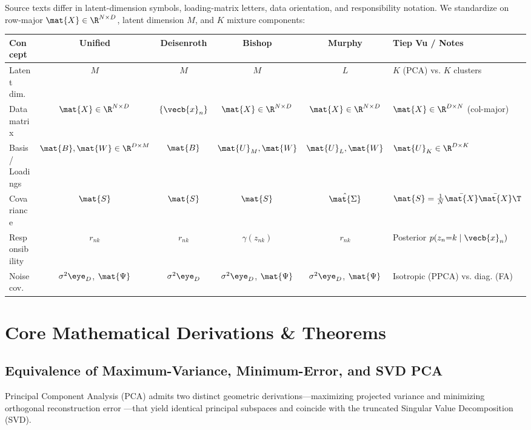 \documentclass[../../../../master.tex]{subfiles}
\begin{document}
\begin{crossbook}
\label{tab:em:notation}
Source texts differ in latent-dimension symbols, loading-matrix letters, data orientation, and responsibility notation. We standardize on row-major $\mat{X} \in \R^{N \times D}$, latent dimension $M$, and $K$ mixture components:
\vspace{4pt}
\begin{center}
\small
\begin{tabularx}{\textwidth}{@{}lccccX@{}}
\toprule
\textbf{Concept} & \textbf{Unified} & \textbf{Deisenroth} & \textbf{Bishop} & \textbf{Murphy} & \textbf{Tiep Vu / Notes} \\
\midrule
Latent dim. & $M$ & $M$ & $M$ & $L$ & $K$ (PCA) vs. $K$ clusters \\
Data matrix & $\mat{X} \in \R^{N \times D}$ & $\{\vecb{x}_n\}$ & $\mat{X} \in \R^{N \times D}$ & $\mat{X} \in \R^{N \times D}$ & $\mat{X} \in \R^{D \times N}$ (col-major) \\
Basis / Loadings & $\mat{B}, \mat{W} \in \R^{D \times M}$ & $\mat{B}$ & $\mat{U}_M, \mat{W}$ & $\mat{U}_L, \mat{W}$ & $\mat{U}_K \in \R^{D \times K}$ \\
Covariance & $\mat{S}$ & $\mat{S}$ & $\mat{S}$ & $\hat{\mat{\Sigma}}$ & $\mat{S} = \frac{1}{N}\bar{\mat{X}}\bar{\mat{X}}\T$ \\
Responsibility & $r_{nk}$ & $r_{nk}$ & $\gamma(z_{nk})$ & $r_{nk}$ & Posterior $p(z_n{=}k \mid \vecb{x}_n)$ \\
Noise cov. & $\sigma^2\eye_D$, $\mat{\Psi}$ & $\sigma^2\eye_D$ & $\sigma^2\eye_D$, $\mat{\Psi}$ & $\sigma^2\eye_D$, $\mat{\Psi}$ & Isotropic (PPCA) vs. diag. (FA) \\
\bottomrule
\end{tabularx}
\end{center}
\end{crossbook}

\section{Core Mathematical Derivations \& Theorems}
\label{sec:em:derivations}

\subsection{Equivalence of Maximum-Variance, Minimum-Error, and SVD PCA}
\label{subsec:em:pca}

Principal Component Analysis (PCA) admits two distinct geometric derivations---maximizing projected variance  and minimizing orthogonal reconstruction error ---that yield identical principal subspaces and coincide with the truncated Singular Value Decomposition (SVD).
\end{document}
